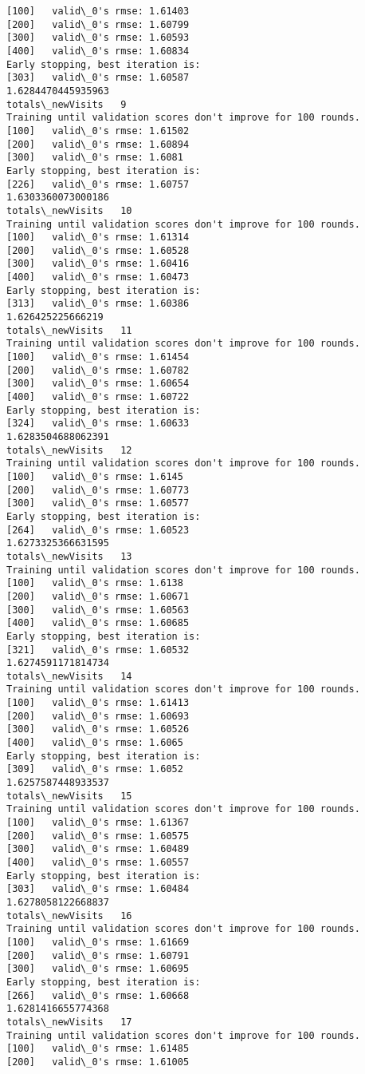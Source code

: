 \documentclass[11pt]{article}
\begin{document}
\begin{Verbatim}[commandchars=\\\{\}]
[100]	valid\_0's rmse: 1.61403
[200]	valid\_0's rmse: 1.60799
[300]	valid\_0's rmse: 1.60593
[400]	valid\_0's rmse: 1.60834
Early stopping, best iteration is:
[303]	valid\_0's rmse: 1.60587
1.6284470445935963
totals\_newVisits   9
Training until validation scores don't improve for 100 rounds.
[100]	valid\_0's rmse: 1.61502
[200]	valid\_0's rmse: 1.60894
[300]	valid\_0's rmse: 1.6081
Early stopping, best iteration is:
[226]	valid\_0's rmse: 1.60757
1.6303360073000186
totals\_newVisits   10
Training until validation scores don't improve for 100 rounds.
[100]	valid\_0's rmse: 1.61314
[200]	valid\_0's rmse: 1.60528
[300]	valid\_0's rmse: 1.60416
[400]	valid\_0's rmse: 1.60473
Early stopping, best iteration is:
[313]	valid\_0's rmse: 1.60386
1.626425225666219
totals\_newVisits   11
Training until validation scores don't improve for 100 rounds.
[100]	valid\_0's rmse: 1.61454
[200]	valid\_0's rmse: 1.60782
[300]	valid\_0's rmse: 1.60654
[400]	valid\_0's rmse: 1.60722
Early stopping, best iteration is:
[324]	valid\_0's rmse: 1.60633
1.6283504688062391
totals\_newVisits   12
Training until validation scores don't improve for 100 rounds.
[100]	valid\_0's rmse: 1.6145
[200]	valid\_0's rmse: 1.60773
[300]	valid\_0's rmse: 1.60577
Early stopping, best iteration is:
[264]	valid\_0's rmse: 1.60523
1.6273325366631595
totals\_newVisits   13
Training until validation scores don't improve for 100 rounds.
[100]	valid\_0's rmse: 1.6138
[200]	valid\_0's rmse: 1.60671
[300]	valid\_0's rmse: 1.60563
[400]	valid\_0's rmse: 1.60685
Early stopping, best iteration is:
[321]	valid\_0's rmse: 1.60532
1.6274591171814734
totals\_newVisits   14
Training until validation scores don't improve for 100 rounds.
[100]	valid\_0's rmse: 1.61413
[200]	valid\_0's rmse: 1.60693
[300]	valid\_0's rmse: 1.60526
[400]	valid\_0's rmse: 1.6065
Early stopping, best iteration is:
[309]	valid\_0's rmse: 1.6052
1.6257587448933537
totals\_newVisits   15
Training until validation scores don't improve for 100 rounds.
[100]	valid\_0's rmse: 1.61367
[200]	valid\_0's rmse: 1.60575
[300]	valid\_0's rmse: 1.60489
[400]	valid\_0's rmse: 1.60557
Early stopping, best iteration is:
[303]	valid\_0's rmse: 1.60484
1.6278058122668837
totals\_newVisits   16
Training until validation scores don't improve for 100 rounds.
[100]	valid\_0's rmse: 1.61669
[200]	valid\_0's rmse: 1.60791
[300]	valid\_0's rmse: 1.60695
Early stopping, best iteration is:
[266]	valid\_0's rmse: 1.60668
1.6281416655774368
totals\_newVisits   17
Training until validation scores don't improve for 100 rounds.
[100]	valid\_0's rmse: 1.61485
[200]	valid\_0's rmse: 1.61005

\end{Verbatim}
\end{document}

